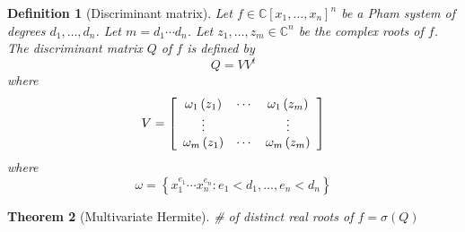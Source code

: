 \documentclass{article}%
\newtheorem{theorem}{Theorem}
\newtheorem{definition}[theorem]{Definition}
\begin{document}
\begin{definition}[Discriminant matrix]
Let  $f\in\mathbb{C}\left[  x_{1},\ldots,x_{n}\right] ^{n}$ be a Pham system of degrees 
$d_{1},\ldots,d_{n}$. 
Let $m=d_{1}\cdots d_{n}$. 
Let $z_{1},\ldots,z_{m}\in\mathbb{C}^{n}$ be the complex roots of $f$.
The discriminant matrix $Q$ of $f$ is defined by
\[
Q=VV^{t}%
\]
where
\[
V=\left[
\begin{array}
[c]{ccc}%
\omega_{1}\left(  z_{1}\right)   & \cdots & \omega_{1}\left(  z_{m}\right)  \\
\vdots                           &        & \vdots\\
\omega_{m}\left(  z_{1}\right)   & \cdots & \omega_{m}\left(  z_{m}\right)
\end{array}
\right]
\]
where%
\[
\omega=\left\{  x_{1}^{e_{1}}\cdots x_{n}^{e_{n}}:e_{1}<d_{1},\ldots,e_{n}<d_{n}\right\}
\]

\end{definition}

\begin{theorem}[Multivariate Hermite]
\# of distinct real roots of $f=\sigma\left(  Q\right)$
\end{theorem}
\end{document}
